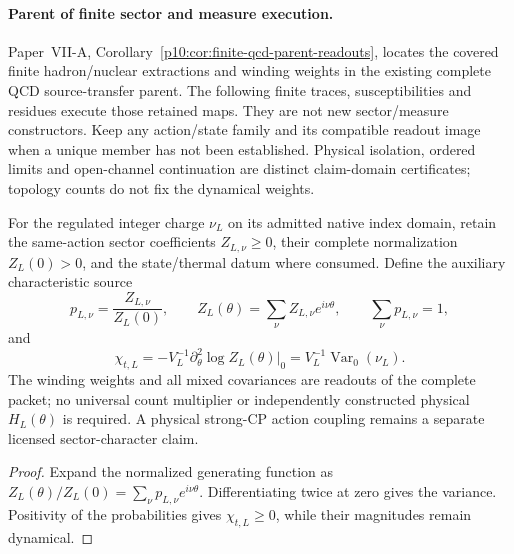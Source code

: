 \documentclass[12pt,a4paper]{article}
\begin{document}
\paragraph{Parent of finite sector and measure execution.}
Paper~VII-A, Corollary~\ref{p10:cor:finite-qcd-parent-readouts}, locates the
covered finite hadron/nuclear extractions and winding weights in the existing
complete QCD source-transfer parent.  The following finite traces,
susceptibilities and residues execute those retained maps.  They are not new
sector/measure constructors.  Keep any action/state family and its compatible
readout image when a unique member has not been established.  Physical
isolation, ordered limits and open-channel continuation are distinct
claim-domain certificates; topology counts do not fix the dynamical weights.

\begin{theorem}
\label{p11:thm:explicit-positive-topological-winding-block}

For the regulated integer charge $\nu_L$ on its admitted native index domain,
retain the same-action sector coefficients $Z_{L,\nu}\ge0$, their complete
normalization $Z_L(0)>0$, and the state/thermal datum where consumed.  Define
the auxiliary characteristic source
\[
 p_{L,\nu}=\frac{Z_{L,\nu}}{Z_L(0)},\qquad
 Z_L(\theta)=\sum_\nu Z_{L,\nu}e^{i\nu\theta},\qquad
 \sum_\nu p_{L,\nu}=1,
\]
and
\[
 \chi_{t,L}=-V_L^{-1}\partial_\theta^2\log Z_L(\theta)|_0
 =V_L^{-1}\operatorname{Var}_0(\nu_L).
\]
The winding weights and all mixed covariances are readouts of the complete
packet; no universal count multiplier or independently constructed physical
$H_L(\theta)$ is required.  A physical strong-CP action coupling remains a
separate licensed sector-character claim.
\label{p11:eq:explicit-mixed-shell-topological-enhancement}
\label{p11:eq:explicit-topological-block-moments}
\label{p11:eq:explicit-positive-topological-transfer}
\end{theorem}
\begin{proof}

Expand the normalized generating function as \(Z_L(\theta)/Z_L(0)=\sum_\nu p_{L,\nu}e^{i\nu\theta}\).  Differentiating twice at zero gives the variance.  Positivity of the probabilities gives \(\chi_{t,L}\ge0\), while their magnitudes remain dynamical.
\end{proof}
\end{document}
